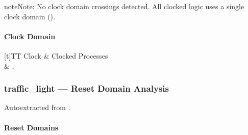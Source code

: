 \documentclass[letterpaper,10pt,english]{sphinxmanual}
\begin{document}
\begin{sphinxadmonition}{note}{Note:}
\sphinxAtStartPar
No clock domain crossings detected. All clocked logic uses a single clock domain ().
\end{sphinxadmonition}


\paragraph{Clock Domain}
\label{\detokenize{modules/traffic_light/cdc:clock-domain}}

\begin{savenotes}\sphinxattablestart
\sphinxthistablewithglobalstyle
\centering
\begin{tabulary}{\linewidth}[t]{TT}
\sphinxtoprule
\sphinxstyletheadfamily 
\sphinxAtStartPar
Clock
&\sphinxstyletheadfamily 
\sphinxAtStartPar
Clocked Processes
\\
\sphinxmidrule
\sphinxtableatstartofbodyhook
\sphinxAtStartPar
{}
&
\sphinxAtStartPar
{}, 
\\
\sphinxbottomrule
\end{tabulary}
\sphinxtableafterendhook\par
\sphinxattableend\end{savenotes}

\sphinxstepscope


\subsubsection{traffic\_light — Reset Domain Analysis}
\label{\detokenize{modules/traffic_light/reset:traffic-light-reset-domain-analysis}}\label{\detokenize{modules/traffic_light/reset::doc}}
\sphinxAtStartPar
Auto\sphinxhyphen{}extracted from .



\paragraph{Reset Domains}
\label{\detokenize{modules/traffic_light/reset:reset-domains}}
\end{document}
